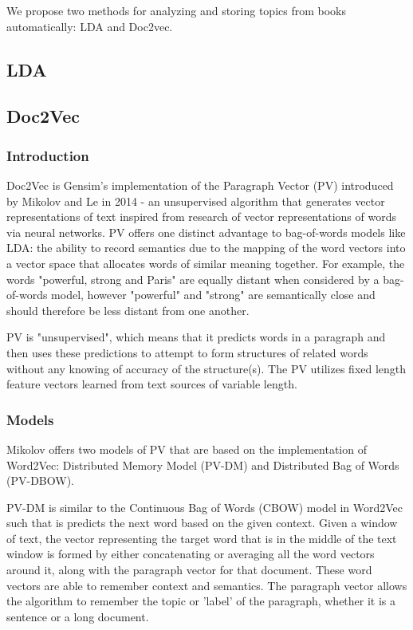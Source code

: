 
We propose two methods for analyzing and storing topics from books automatically: LDA and Doc2vec. 

\subsection{LDA}
\label{sec:lda}


\subsection{Doc2Vec}
\label{sec:doc2vec}

\subsubsection{Introduction}

Doc2Vec is Gensim's implementation of the Paragraph Vector (PV) introduced by Mikolov and Le in 2014 - an unsupervised algorithm that generates vector representations of text inspired from research of vector representations of words via neural networks. \cite{RefWorks:doc:5aa699f3e4b0570b52523dee} \cite{RefWorks:doc:5a6e5746e4b0d609eec798d7} PV offers one distinct advantage to bag-of-words models like LDA: the ability to record semantics due to the mapping of the word vectors into a vector space that allocates words of similar meaning together. For example, the words "powerful, strong and Paris" are equally distant when considered by a bag-of-words model, however "powerful" and "strong" are semantically close and should therefore be less distant from one another. \cite{RefWorks:doc:5a6e5746e4b0d609eec798d7}
	
PV is "unsupervised", which means that it predicts words in a paragraph and then uses these predictions to attempt to form structures of related words without any knowing of accuracy of the structure(s). The PV utilizes fixed length feature vectors learned from text sources of variable length. 


\subsubsection{Models}
Mikolov offers two models of PV that are based on the implementation of Word2Vec: Distributed Memory Model (PV-DM) and Distributed Bag of Words (PV-DBOW). 

PV-DM is similar to the Continuous Bag of Words (CBOW) model in Word2Vec such that is predicts the next word based on the given context. Given a window of text, the vector representing the target word that is in the middle of the text window is formed by either concatenating or averaging all the word vectors around it, along with the paragraph vector for that document. These word vectors are able to remember context and semantics. The paragraph vector allows the algorithm to remember the topic or 'label' of the paragraph, whether it is a sentence or a long document. 

